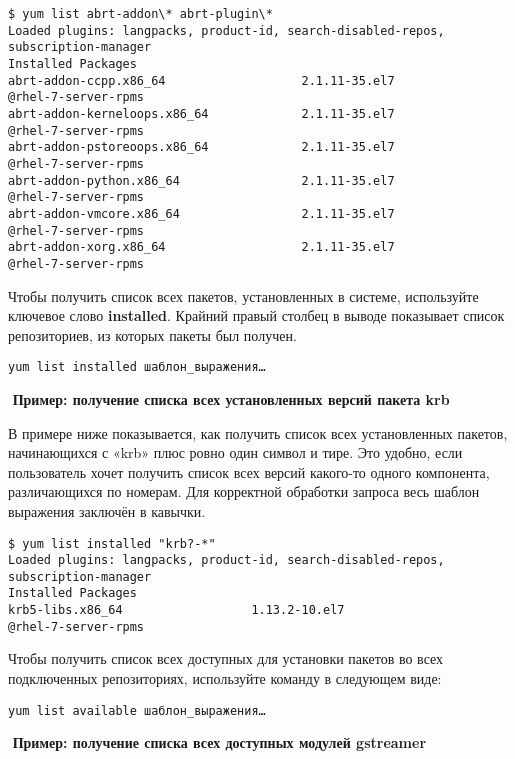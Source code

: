 \documentclass[a4paper,10pt,twoside]{article}
\begin{document}
\begin{verbatim}
$ yum list abrt-addon\* abrt-plugin\*
Loaded plugins: langpacks, product-id, search-disabled-repos, subscription-manager
Installed Packages
abrt-addon-ccpp.x86_64                   2.1.11-35.el7             @rhel-7-server-rpms
abrt-addon-kerneloops.x86_64             2.1.11-35.el7             @rhel-7-server-rpms
abrt-addon-pstoreoops.x86_64             2.1.11-35.el7             @rhel-7-server-rpms
abrt-addon-python.x86_64                 2.1.11-35.el7             @rhel-7-server-rpms
abrt-addon-vmcore.x86_64                 2.1.11-35.el7             @rhel-7-server-rpms
abrt-addon-xorg.x86_64                   2.1.11-35.el7             @rhel-7-server-rpms
\end{verbatim} 



Чтобы получить список всех пакетов, установленных в системе, используйте ключевое слово \textbf{installed}. Крайний правый столбец в выводе показывает список репозиториев, из которых пакеты был получен.
\begin{verbatim}
yum list installed шаблон_выражения…\end{verbatim} 
⁠
\textbf{Пример: получение списка всех установленных версий пакета krb}

В примере ниже показывается, как получить список всех установленных пакетов, начинающихся с «krb» плюс ровно один символ и тире. Это удобно, если пользователь хочет получить список всех версий какого-то одного компонента, различающихся по номерам. Для корректной обработки запроса весь шаблон выражения заключён в кавычки.

\begin{verbatim}
$ yum list installed "krb?-*"
Loaded plugins: langpacks, product-id, search-disabled-repos, subscription-manager
Installed Packages
krb5-libs.x86_64                  1.13.2-10.el7                   @rhel-7-server-rpms
\end{verbatim} 

Чтобы получить список всех доступных для установки пакетов во всех подключенных репозиториях, используйте команду в следующем виде:
\begin{verbatim}
yum list available шаблон_выражения…
\end{verbatim} 
⁠
\textbf{Пример: получение списка всех доступных модулей gstreamer}
\end{document}
